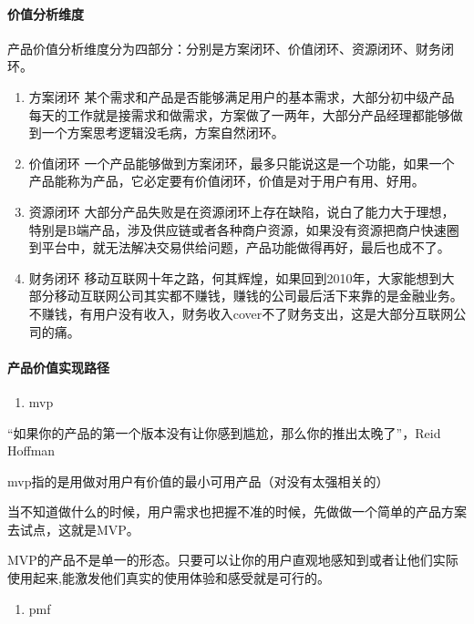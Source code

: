 \documentclass[letterpaper,11pt,english]{sphinxmanual}
\begin{document}
\paragraph{价值分析维度}
\label{\detokenize{chapter_project/valuable:id3}}
产品价值分析维度分为四部分：分别是方案闭环、价值闭环、资源闭环、财务闭环。
\begin{enumerate}
%
\item {} 
方案闭环
某个需求和产品是否能够满足用户的基本需求，大部分初中级产品每天的工作就是接需求和做需求，方案做了一两年，大部分产品经理都能够做到一个方案思考逻辑没毛病，方案自然闭环。

\item {} 
价值闭环
一个产品能够做到方案闭环，最多只能说这是一个功能，如果一个产品能称为产品，它必定要有价值闭环，价值是对于用户有用、好用。

\item {} 
资源闭环
大部分产品失败是在资源闭环上存在缺陷，说白了能力大于理想，特别是B端产品，涉及供应链或者各种商户资源，如果没有资源把商户快速圈到平台中，就无法解决交易供给问题，产品功能做得再好，最后也成不了。

\item {} 
财务闭环
移动互联网十年之路，何其辉煌，如果回到2010年，大家能想到大部分移动互联网公司其实都不赚钱，赚钱的公司最后活下来靠的是金融业务。不赚钱，有用户没有收入，财务收入cover不了财务支出，这是大部分互联网公司的痛。

\end{enumerate}


\paragraph{产品价值实现路径}
\label{\detokenize{chapter_project/valuable:id4}}\begin{enumerate}
%
\item {} 
mvp

\end{enumerate}

“如果你的产品的第一个版本没有让你感到尴尬，那么你的推出太晚了”，Reid
Hoffman

mvp指的是用做对用户有价值的最小可用产品（对没有太强相关的）

当不知道做什么的时候，用户需求也把握不准的时候，先做做一个简单的产品方案去试点，这就是MVP。

MVP的产品不是单一的形态。只要可以让你的用户直观地感知到或者让他们实际使用起来,能激发他们真实的使用体验和感受就是可行的。
\begin{enumerate}
%
\item {} 
pmf

\end{enumerate}
\end{document}
